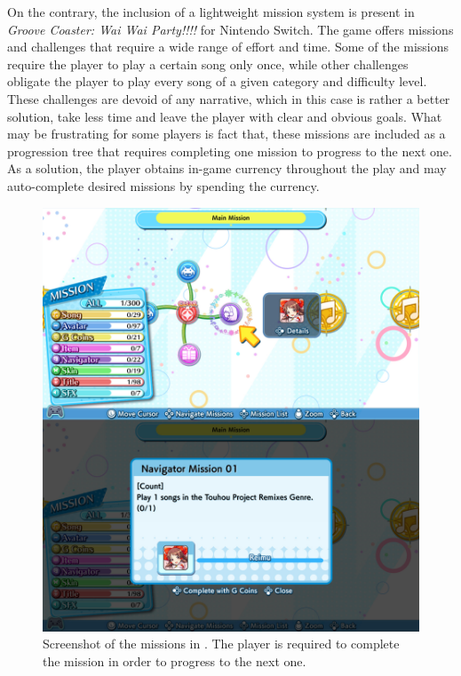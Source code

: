 On the contrary, the inclusion of a lightweight mission system is present in \textit{Groove Coaster: Wai Wai Party!!!!} for Nintendo Switch. The game offers missions and challenges that require a wide range of effort and time. Some of the missions require the player to play a certain song only once, while other challenges obligate the player to play every song of a given category and difficulty level. These challenges are devoid of any narrative, which in this case is rather a better solution, take less time and leave the player with clear and obvious goals. What may be frustrating for some players is fact that, these missions are included as a progression tree that requires completing one mission to progress to the next one. As a solution, the player obtains in-game currency throughout the play and may auto-complete desired missions by spending the currency.

\begin{figure}[h]
    \centering\includegraphics[scale=0.155]{obrazki/groovecoastermissions.jpg}
    \caption{Screenshot of the missions in . The player is required to complete the mission in order to progress to the next one. \cite{groovecoastermissions}}
    \label{fig:gcmission}
\end{figure}

